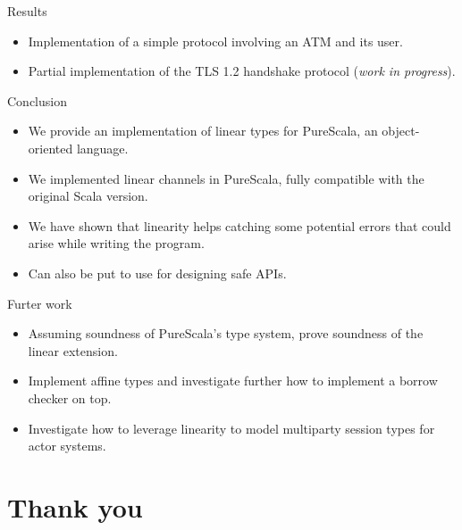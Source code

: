 \documentclass[ignorenonframetext,]{beamer}
\providecommand{\tightlist}{%
  \setlength{\itemsep}{0pt}\setlength{\parskip}{0pt}}
\begin{document}
\begin{frame}{%
\protect\hypertarget{results-1}{%
Results}}

\begin{itemize}
\tightlist
\item
  Implementation of a simple protocol involving an ATM and its user.
\item
  Partial implementation of the TLS 1.2 handshake protocol (\emph{work
  in progress}).
\end{itemize}

\end{frame}

\begin{frame}{%
\protect\hypertarget{conclusion-2}{%
Conclusion}}

\begin{itemize}
\tightlist
\item
  We provide an implementation of linear types for PureScala, an
  object-oriented language.
\item
  We implemented linear channels in PureScala, fully compatible with the
  original Scala version.
\item
  We have shown that linearity helps catching some potential errors that
  could arise while writing the program.
\item
  Can also be put to use for designing safe APIs.
\end{itemize}

\end{frame}

\begin{frame}{%
\protect\hypertarget{furter-work}{%
Furter work}}

\begin{itemize}
\tightlist
\item
  Assuming soundness of PureScala’s type system, prove soundness of the
  linear extension.
\item
  Implement affine types and investigate further how to implement a
  borrow checker on top.
\item
  Investigate how to leverage linearity to model multiparty session
  types for actor systems.
\end{itemize}

\end{frame}

\hypertarget{thank-you}{%
\section{Thank you}\label{thank-you}}
\end{document}

